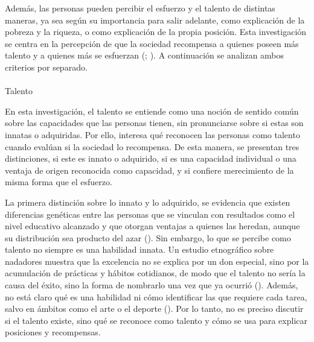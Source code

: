 \documentclass[
  spanish,
  a4paper,
  oneside]{scrbook}
\makeatletter
\let\oldparagraph\paragraph
\renewcommand{\paragraph}{
    \@ifstar
      \xxxParagraphStar
      \xxxParagraphNoStar
  }
\newcommand{\xxxParagraphStar}[1]{\oldparagraph*{#1}\mbox{}}
\newcommand{\xxxParagraphNoStar}[1]{\oldparagraph{#1}\mbox{}}
\makeatother
\begin{document}
Además, las personas pueden percibir el esfuerzo y el talento de
distintas maneras, ya sea según su importancia para salir adelante, como
explicación de la pobreza y la riqueza, o como explicación de la propia
posición. Esta investigación se centra en la percepción de que la
sociedad recompensa a quienes poseen más talento y a quienes más se
esfuerzan (; ).
A continuación se analizan ambos criterios por separado.

\paragraph{Talento}\label{talento-1}

En esta investigación, el talento se entiende como una noción de sentido
común sobre las capacidades que las personas tienen, sin pronunciarse
sobre si estas son innatas o adquiridas. Por ello, interesa qué
reconocen las personas como talento cuando evalúan si la sociedad lo
recompensa. De esta manera, se presentan tres distinciones, si este es
innato o adquirido, si es una capacidad individual o una ventaja de
origen reconocida como capacidad, y si confiere merecimiento de la misma
forma que el esfuerzo.

La primera distinción sobre lo innato y lo adquirido, se evidencia que
existen diferencias genéticas entre las personas que se vinculan con
resultados como el nivel educativo alcanzado y que otorgan ventajas a
quienes las heredan, aunque su distribución sea producto del azar
(). Sin embargo, lo que se
percibe como talento no siempre es una habilidad innata. Un estudio
etnográfico sobre nadadores muestra que la excelencia no se explica por
un don especial, sino por la acumulación de prácticas y hábitos
cotidianos, de modo que el talento no sería la causa del éxito, sino la
forma de nombrarlo una vez que ya ocurrió
(). Además, no
está claro qué es una habilidad ni cómo identificar las que requiere
cada tarea, salvo en ámbitos como el arte o el deporte
(). Por lo
tanto, no es preciso discutir si el talento existe, sino qué se reconoce
como talento y cómo se usa para explicar posiciones y recompensas.
\end{document}
